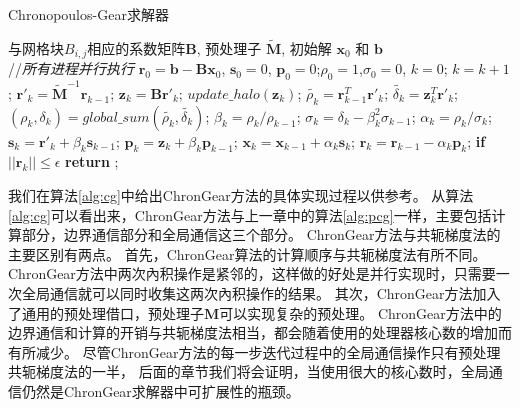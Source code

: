 \begin{algorithm}[!t]
\caption{Chronopoulos-Gear求解器}
\label{alg:cg}
\begin{algorithmic}[1]
\REQUIRE   与网格块$B_{i,j}$相应的系数矩阵$\textbf{B}$, 预处理子 $\tilde{\textbf{M}}$, 初始解 $\textbf{x}_0$ 和 $\textbf{b}$  \\
//\qquad    \textit{所有进程并行执行}
\STATE $\textbf{r}_0 = \textbf{b}-\textbf{B}\textbf{x}_0$, $\textbf{s}_0 =0$, $\textbf{p}_0 =0$;\quad $\rho_0=1$,$\sigma_0=0$, $k=0$;
\STATE $k=k+1$;
\STATE $\textbf{r}'_{k} =\tilde{\textbf{M}}^{-1}\textbf{r}_{k-1}$; \label{pcg_scale0} 
\STATE $\textbf{z}_k = \textbf{B}\textbf{r}'_{k}$; \label{pcg_mat}
\STATE $update\_halo(\textbf{z}_{k})$;  \label{pcg_bc1}
\STATE $\tilde{\rho_k} = \textbf{r}_{k-1}^T\textbf{r}'_{k}$;\label{pcg_dot1}
\STATE $\tilde{\delta_k} = \textbf{z}_k^T\textbf{r}'_k$;\label{pcg_dot2}
\STATE $(\rho_k,\delta_k) = global\_sum(\tilde{\rho_k},\tilde{\delta_k})$;\label{pcg_global1} 
\STATE $\beta_k = \rho_k / \rho_{k-1}$;\label{pcg_beta}
\STATE $\sigma_k = \delta_k - \beta_k^2\sigma_{k-1}$;\label{pcg_sigma}
\STATE $\alpha_k = \rho_k /\sigma_{k}$;\label{pcg_alpha}
\STATE $\textbf{s}_k = \textbf{r}'_{k} +\beta_k\textbf{s}_{k-1}$;\label{pcg_scale1}
\STATE $\textbf{p}_k = \textbf{z}_{k} +\beta_k\textbf{p}_{k-1}$;\label{pcg_scale2}
\STATE $\textbf{x}_k =\textbf{x}_{k-1} +\alpha_k \textbf{s}_k$;\label{pcg_scale3}
\STATE $\textbf{r}_k =\textbf{r}_{k-1} -\alpha_k\textbf{p}_k$;\label{pcg_scale4}
\STATE \textbf{if} $||\textbf{r}_k|| \le \epsilon$  \textbf{return} ;
\ENDIF
\ENDWHILE
\end{algorithmic}
\end{algorithm}

我们在算法\ref{alg:cg}中给出ChronGear方法的具体实现过程以供参考。
从算法\ref{alg:cg}可以看出来，ChronGear方法与上一章中的算法\ref{alg:pcg}一样，主要包括计算部分，边界通信部分和全局通信这三个部分。
ChronGear方法与共轭梯度法的主要区别有两点。
首先，ChronGear算法的计算顺序与共轭梯度法有所不同。
ChronGear方法中两次內积操作是紧邻的，这样做的好处是并行实现时，只需要一次全局通信就可以同时收集这两次內积操作的结果。
其次，ChronGear方法加入了通用的预处理借口，预处理子$\textbf{M}$可以实现复杂的预处理。 
ChronGear方法中的边界通信和计算的开销与共轭梯度法相当，都会随着使用的处理器核心数的增加而有所减少。 
尽管ChronGear方法的每一步迭代过程中的全局通信操作只有预处理共轭梯度法的一半，
后面的章节我们将会证明，当使用很大的核心数时，全局通信仍然是ChronGear求解器中可扩展性的瓶颈。


